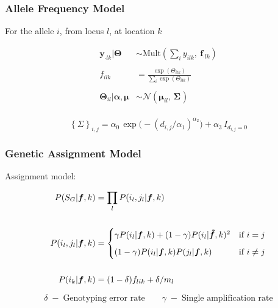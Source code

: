 \documentclass[t]{beamer}\usepackage[]{graphicx}\usepackage[]{color}
\begin{document}

\begin{frame}
\frametitle{Allele Frequency Model}

For the allele $i$, from locus $l$, at location $k$

\begin{align*}
\bm{y}_{\cdot l k}|\bm{\Theta} &\sim \text{Mult}\left(\textstyle\sum_i y_{ilk},\: \bm{f}_{\cdot l k}\right) \\
\\
f_{ilk} &= \frac{\exp(\Theta_{ilk})}{\sum_i \exp(\Theta_{ilk})} \\
\\
\bm{\Theta}_{il}|\bm{\alpha},\bm{\mu} &\sim \mathcal{N}( \bm{\mu}_{il},\, \bm{\Sigma_{}}) \\
\end{align*}

\[ \left\{\Sigma\right\}_{i,j} = \alpha_0 \, \exp \Big(-(d_{i,j}/\alpha_1)^{\alpha_2} \Big) + \alpha_3 \, I_{d_{i,j}=0} \]

\end{frame}




\begin{frame}
\frametitle{Genetic Assignment  Model}

Assignment model:

\begin{align*}
P(S_G|\bm{f},k) &= \prod_l P(i_l, j_l | \bm{f},k) \\
\\
P(i_l, j_l | \bm{f},k) &= 
\begin{cases}
\gamma P(i_l|\bm{f},k) + (1-\gamma)P(i_l|\bm{\tilde f},k)^2 & \text{if $i=j$} \vspace{2mm} \\
(1-\gamma) P(i_l|\bm{f},k) P(j_l|\bm{f},k)      & \text{if $i \ne j$}
\end{cases} \\
\\
P(i_k|\bm{f},k) &= (1-\delta) f_{lik} + \delta / m_l
\end{align*}

\vfill

\[\delta \;-\; \text{Genotyping error rate} \quad\quad \gamma \;-\; \text{Single amplification rate}\]

\end{frame}
\end{document}
